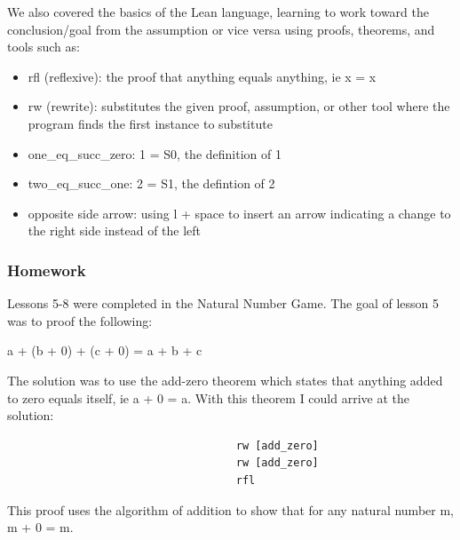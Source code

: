 \documentclass{article}
\theoremstyle{theorem}
\theoremstyle{definition}
\theoremstyle{remark}
\begin{document}
\hspace{0.65cm}We also covered the basics of the Lean language, learning to work toward the conclusion/goal from the assumption or vice versa using proofs, theorems, and tools such as:

\begin{itemize}
\item rfl (reflexive): the proof that anything equals anything, ie x = x
\item rw (rewrite): substitutes the given proof, assumption, or other tool where the program finds the first instance to substitute
\item one\_eq\_succ\_zero: 1 = S0, the definition of 1
\item two\_eq\_succ\_one: 2 = S1, the defintion of 2
\item opposite side arrow: using l + space to insert an arrow indicating a change to the right side instead of the left
\end{itemize}

\subsubsection{Homework}

Lessons 5-8 were completed in the Natural Number Game. The goal of lesson 5 was to proof the following:
\begin{center}
  a + (b + 0) + (c + 0) = a + b + c
\end{center}
The solution was to use the add-zero theorem which states that anything added to zero equals itself, ie a + 0 = a. With this theorem I could arrive at the solution:
\begin{verbatim}
                                    rw [add_zero] 
                                    rw [add_zero] 
                                    rfl
\end{verbatim}
This proof uses the algorithm of addition to show that for any natural number m, m + 0 = m.
\end{document}
